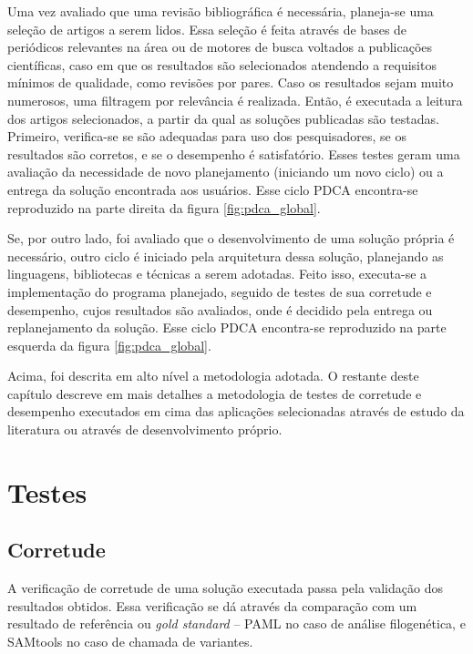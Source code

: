 \documentclass[cic,tc]{iiufrgs}
\begin{document}
Uma vez avaliado que uma revisão bibliográfica é necessária, planeja-se uma
seleção de artigos a serem lidos. Essa seleção é feita através de bases de
periódicos relevantes na área ou de motores de busca voltados a publicações
científicas, caso em que os resultados são selecionados atendendo a requisitos
mínimos de qualidade, como revisões por pares. Caso os resultados sejam muito
numerosos, uma filtragem por relevância é realizada. Então, é executada a
leitura dos artigos selecionados, a partir da qual as soluções publicadas são
testadas. Primeiro, verifica-se se são adequadas para uso dos pesquisadores, se
os resultados são corretos, e se o desempenho é satisfatório. Esses testes
geram uma avaliação da necessidade de novo planejamento (iniciando um novo
ciclo) ou a entrega da solução encontrada aos usuários. Esse ciclo PDCA
encontra-se reproduzido na parte direita da figura \ref{fig:pdca_global}.

Se, por outro lado, foi avaliado que o desenvolvimento de uma solução própria é
necessário, outro ciclo é iniciado pela arquitetura dessa solução, planejando
as linguagens, bibliotecas e técnicas a serem adotadas. Feito isso, executa-se
a implementação do programa planejado, seguido de testes de sua corretude e
desempenho, cujos resultados são avaliados, onde é decidido pela entrega ou
replanejamento da solução. Esse ciclo PDCA encontra-se reproduzido na parte
esquerda da figura \ref{fig:pdca_global}.

Acima, foi descrita em alto nível a metodologia adotada. O restante deste
capítulo descreve em mais detalhes a metodologia de testes de corretude e
desempenho executados em cima das aplicações selecionadas através de estudo da
literatura ou através de desenvolvimento próprio.

\section{Testes}
\label{sec:test}

\subsection{Corretude}

A verificação de corretude de uma solução executada passa pela validação dos
resultados obtidos. Essa verificação se dá através da comparação com um
resultado de referência ou \textit{gold standard} -- PAML no caso de análise
filogenética, e SAMtools no caso de chamada de variantes.
\end{document}
